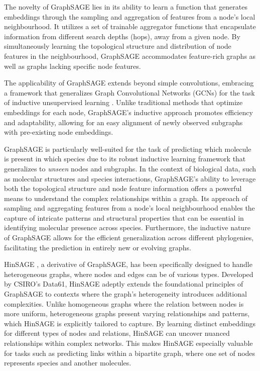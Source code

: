 \documentclass[
11pt, %
oneside, %
english, %
singlespacing, %
headsepline, %
chapterinoneline, %
]{MastersDoctoralThesis} %
\begin{document}
The novelty of GraphSAGE lies in its ability to learn a function that generates embeddings through the sampling and aggregation of features from a node's local neighbourhood. It utilizes a set of trainable aggregator functions that encapsulate information from different search depths (hops), away from a given node. By simultaneously learning the topological structure and distribution of node features in the neighbourhood, GraphSAGE accommodates feature-rich graphs as well as graphs lacking specific node features.

The applicability of GraphSAGE extends beyond simple convolutions, embracing a framework that generalizes Graph Convolutional Networks (GCNs) for the task of inductive unsupervised learning \cite{kipfSemiSupervisedClassificationGraph2016}. Unlike traditional methods that optimize embeddings for each node, GraphSAGE's inductive approach promotes efficiency and adaptability, allowing for an easy alignment of newly observed subgraphs with pre-existing node embeddings.

GraphSAGE is particularly well-suited for the task of predicting which molecule is present in which species due to its robust inductive learning framework that generalizes to \textit{unseen} nodes and subgraphs. In the context of biological data, such as molecular structures and species interactions, GraphSAGE's ability to leverage both the topological structure and node feature information offers a powerful means to understand the complex relationships within a graph. Its approach of sampling and aggregating features from a node's local neighbourhood enables the capture of intricate patterns and structural properties that can be essential in identifying molecular presence across species. Furthermore, the inductive nature of GraphSAGE allows for the efficient generalization across different phylogenies, facilitating the prediction in entirely new or evolving graphs.

HinSAGE \cite{StellarGraphMachineLearning2018}, a derivative of GraphSAGE, has been specifically designed to handle heterogeneous graphs, where nodes and edges can be of various types. Developed by CSIRO's Data61, HinSAGE adeptly extends the foundational principles of GraphSAGE to contexts where the graph's heterogeneity introduces additional complexities. Unlike homogeneous graphs where the relation between nodes is more uniform, heterogeneous graphs present varying relationships and patterns, which HinSAGE is explicitly tailored to capture. By learning distinct embeddings for different types of nodes and relations, HinSAGE can uncover nuanced relationships within complex networks. This makes HinSAGE especially valuable for tasks such as predicting links within a bipartite graph, where one set of nodes represents species and another molecules. 
\end{document}
